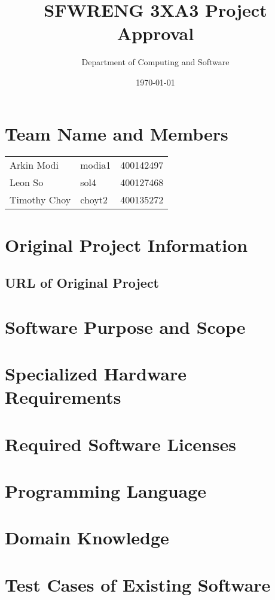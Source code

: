 \documentclass[12pt]{article}
\title{SFWRENG 3XA3 Project Approval}
\author{Department of Computing and Software}
\date{\today}
\begin{document}
\maketitle

\section{Team Name and Members}

\begin{tabular}{l l l}
    Arkin Modi & modia1 & 400142497 \\
    Leon So & sol4 & 400127468 \\
    Timothy Choy & choyt2 & 400135272
\end{tabular}

\section{Original Project Information}
\subsection{URL of Original Project}

\section{Software Purpose and Scope}

\section{Specialized Hardware Requirements}

\section{Required Software Licenses}

\section{Programming Language}

\section{Domain Knowledge}

\section{Test Cases of Existing Software}
\end{document}
